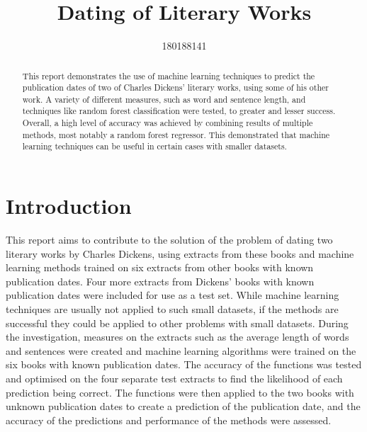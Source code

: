\documentclass[11pt,a4paper,reqno]{amsart}
\title{Dating of Literary Works}
\author{180188141}
\begin{document}
\maketitle
\thispagestyle{empty}


\begin{abstract}

This report demonstrates the use of machine learning techniques to predict the publication dates of two of Charles Dickens' literary works, using some of his other work. A variety of different measures, such as word and sentence length, and techniques like random forest classification were tested, to greater and lesser success. Overall, a high level of accuracy was achieved by combining results of multiple methods, most notably a random forest regressor. This demonstrated that machine learning techniques can be useful in certain cases with smaller datasets. 

\end{abstract}
\clearpage
{}

\newpage
\tableofcontents
\newpage

\section{Introduction}

This report aims to contribute to the solution of the problem of dating two literary works by Charles Dickens, using extracts from these books and machine learning methods trained on six extracts from other books with known publication dates. Four more extracts from Dickens' books with known publication dates were included for use as a test set. While machine learning techniques are usually not applied to such small datasets, if the methods are successful they could be applied to other problems with small datasets. During the investigation, measures on the extracts such as the average length of words and sentences were created and machine learning algorithms were trained on the six books with known publication dates. The accuracy of the functions was tested and optimised on the four separate test extracts to find the likelihood of each prediction being correct. The functions were then applied to the two books with unknown publication dates to create a prediction of the publication date, and the accuracy of the predictions and performance of the methods were assessed. 
\end{document}
